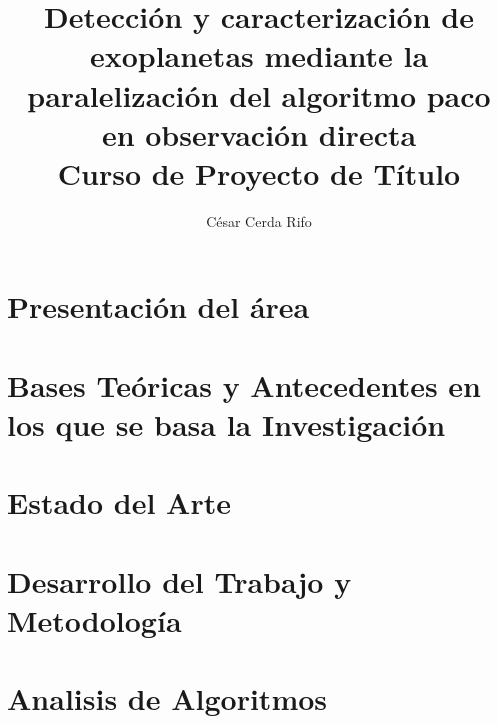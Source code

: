 \documentclass[final,letterpaper,oneside,authoryear,11pt,singlespace,spanish]{ezthesis}
\author{César Cerda Rifo}
\title{Detección y caracterización de exoplanetas mediante la paralelización del algoritmo paco en observación directa\\
    Curso de Proyecto de Título}
\begin{document}
\cleardoublepage
{}
\setcounter{page}{1}






%
%
%
%

\tableofcontents
\renewcommand{\listfigurename}{Índice de Figuras}
\listoffigures
\renewcommand{\listtablename}{Índice de Tablas}
\listoftables

\cleardoublepage
{}
\setcounter{page}{1}


\chapter{Presentación del área}  \label{cap:introduccion}


\chapter{Bases Teóricas y Antecedentes en los que se basa la Investigación} \label{cap:marco_teorico}


\chapter{Estado del Arte} 
\label{cap:estado_del_arte}

\chapter{Desarrollo del Trabajo y Metodología} \label{cap:metodologia}


\chapter{Analisis de Algoritmos}  \label{cap:algoritmos}

\end{document}
